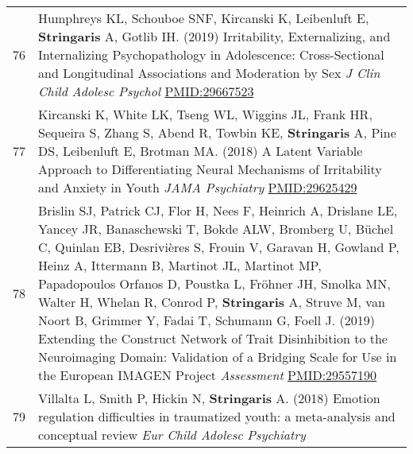 \documentclass[
]{article}
\begin{document}
\begin{longtable}[]{@{}ll@{}}
\begin{minipage}[t]{0.01\columnwidth}\raggedright
76\strut
\end{minipage} & \begin{minipage}[t]{0.94\columnwidth}\raggedright
Humphreys KL, Schouboe SNF, Kircanski K, Leibenluft E,
\textbf{Stringaris} A, Gotlib IH. (2019) Irritability, Externalizing,
and Internalizing Psychopathology in Adolescence: Cross-Sectional and
Longitudinal Associations and Moderation by Sex \emph{J Clin Child
Adolesc Psychol} \url{PMID:29667523}\strut
\end{minipage}\tabularnewline
\begin{minipage}[t]{0.01\columnwidth}\raggedright
77\strut
\end{minipage} & \begin{minipage}[t]{0.94\columnwidth}\raggedright
Kircanski K, White LK, Tseng WL, Wiggins JL, Frank HR, Sequeira S, Zhang
S, Abend R, Towbin KE, \textbf{Stringaris} A, Pine DS, Leibenluft E,
Brotman MA. (2018) A Latent Variable Approach to Differentiating Neural
Mechanisms of Irritability and Anxiety in Youth \emph{JAMA Psychiatry}
\url{PMID:29625429}\strut
\end{minipage}\tabularnewline
\begin{minipage}[t]{0.01\columnwidth}\raggedright
78\strut
\end{minipage} & \begin{minipage}[t]{0.94\columnwidth}\raggedright
Brislin SJ, Patrick CJ, Flor H, Nees F, Heinrich A, Drislane LE, Yancey
JR, Banaschewski T, Bokde ALW, Bromberg U, Büchel C, Quinlan EB,
Desrivières S, Frouin V, Garavan H, Gowland P, Heinz A, Ittermann B,
Martinot JL, Martinot MP, Papadopoulos Orfanos D, Poustka L, Fröhner JH,
Smolka MN, Walter H, Whelan R, Conrod P, \textbf{Stringaris} A, Struve
M, van Noort B, Grimmer Y, Fadai T, Schumann G, Foell J. (2019)
Extending the Construct Network of Trait Disinhibition to the
Neuroimaging Domain: Validation of a Bridging Scale for Use in the
European IMAGEN Project \emph{Assessment} \url{PMID:29557190}\strut
\end{minipage}\tabularnewline
\begin{minipage}[t]{0.01\columnwidth}\raggedright
79\strut
\end{minipage} & \begin{minipage}[t]{0.94\columnwidth}\raggedright
Villalta L, Smith P, Hickin N, \textbf{Stringaris} A. (2018) Emotion
regulation difficulties in traumatized youth: a meta-analysis and
conceptual review \emph{Eur Child Adolesc Psychiatry}

\end{minipage}
\end{longtable}
\end{document}
